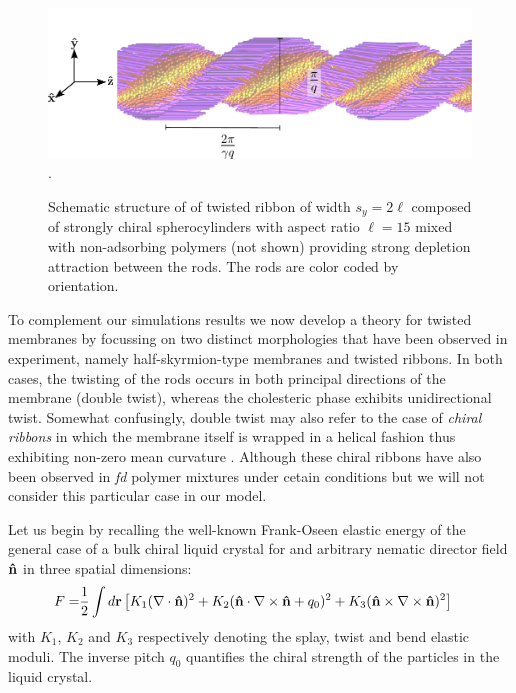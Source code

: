 \begin{figure}
\begin{center}
\includegraphics[width= \columnwidth]{figures/chapter-5/ribbon_sketch}.
\caption{ \label{ribsnap} Schematic structure of of twisted ribbon of width $s_y=2\ell$ composed of strongly chiral spherocylinders with aspect ratio $\ell = 15$ mixed with non-adsorbing polymers (not shown) providing strong depletion attraction between the rods. The rods are color coded by orientation.  }
\end{center}
\end{figure}


 To complement our simulations results we now develop a theory for twisted membranes by focussing on two distinct morphologies that have been observed in experiment, namely half-skyrmion-type membranes and twisted ribbons. In both cases, the twisting of the rods occurs in both principal directions of the membrane (double twist), whereas the cholesteric phase exhibits unidirectional twist. Somewhat confusingly, double twist may also refer to the case of {\em chiral ribbons} in which the membrane itself is wrapped 
in a helical fashion thus exhibiting non-zero mean curvature \cite{green1936equilibrium,chopin2016roadmap}. Although these chiral ribbons have also been observed in {\em fd} polymer mixtures under cetain conditions \cite{Gibaud2014} but we will not consider this particular case in our model. 
 
 
 Let us begin by recalling the well-known Frank-Oseen elastic energy of the general case of a bulk chiral liquid crystal for and arbitrary nematic director field ${\bf \hat{n}}$ in three spatial dimensions:
\begin{align} 
F = & \frac{1}{2} \int d {\bf r} \left [ K_{1} (\nabla \cdot {\bf \hat{n}})^{2}  + K_{2} ({\bf \hat{n}} \cdot \nabla \times {\bf \hat{n}} + q_{0})^{2}  +   K_{3} ({\bf \hat{n}} \times \nabla \times {\bf \hat{n}})^{2} \right ]  
\end{align}
with $K_{1}$, $K_{2}$ and $K_{3}$ respectively denoting the splay, twist and bend elastic moduli.   The inverse  pitch  $q_{0}$ quantifies the chiral strength of the particles in the liquid crystal. 


